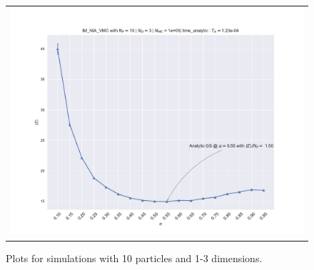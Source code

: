 \begin{figure}
\begin{tabular}{cc}
\multicolumn{2}{c}{\includegraphics[width=0.5\paperwidth]{figures/c_figs/IM_NIA_np_10_nd_3.pdf} }
\end{tabular}
	\caption{Plots for simulations with 10 particles and 1-3 dimensions.}
\label{fig:1c_10}
\end{figure}

